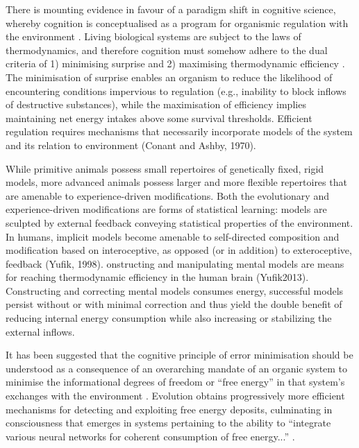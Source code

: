 \begin{CJK}{UTF8}{gbsn}
There is mounting evidence in favour of a paradigm shift in cognitive science, whereby cognition is conceptualised as a program for organismic regulation with the environment \citep{Yufik2017}.  Living biological systems are subject to the laws of thermodynamics, and therefore cognition must somehow adhere to the dual criteria of 1) minimising surprise \citep{Friston2010,Sengupta2013,Sengupta2016,SenguptaFriston2017} and 2) maximising thermodynamic efficiency \citep{Yufik2002,Yufik2013}.  The minimisation of surprise enables an organism to reduce the likelihood of encountering conditions impervious to regulation (e.g., inability to block inflows of destructive substances), while the maximisation of efficiency implies maintaining net energy intakes above some survival thresholds.  Efficient regulation requires mechanisms that necessarily incorporate models of the system and its relation to environment (Conant and Ashby, 1970).

While primitive animals possess small repertoires of genetically fixed, rigid models, more advanced animals possess larger and more flexible repertoires that are amenable to experience-driven modifications. Both the evolutionary and experience-driven modifications are forms of statistical learning: models are sculpted by external feedback conveying statistical properties of the environment. In humans, implicit models become amenable to self-directed composition and modification based on interoceptive, as opposed (or in addition) to exteroceptive, feedback (Yufik, 1998).
onstructing and manipulating mental models are means for reaching thermodynamic efficiency in the human brain (Yufik2013).  Constructing and correcting mental models consumes energy, successful models persist without or with minimal correction and thus yield the double benefit of reducing internal energy consumption while also increasing or stabilizing the external inflows.

It has been suggested that the cognitive principle of error minimisation should be understood as a consequence of an overarching mandate of an organic system to minimise the informational degrees of freedom or ``free energy'' in that system's exchanges with the environment \citep{Friston2010}.  Evolution obtains progressively more efficient mechanisms for detecting and exploiting free energy deposits, culminating in consciousness that emerges in systems pertaining to the ability to ``integrate various neural networks for coherent consumption of free energy...'' \citep{Annila2017}.



\end{CJK}
